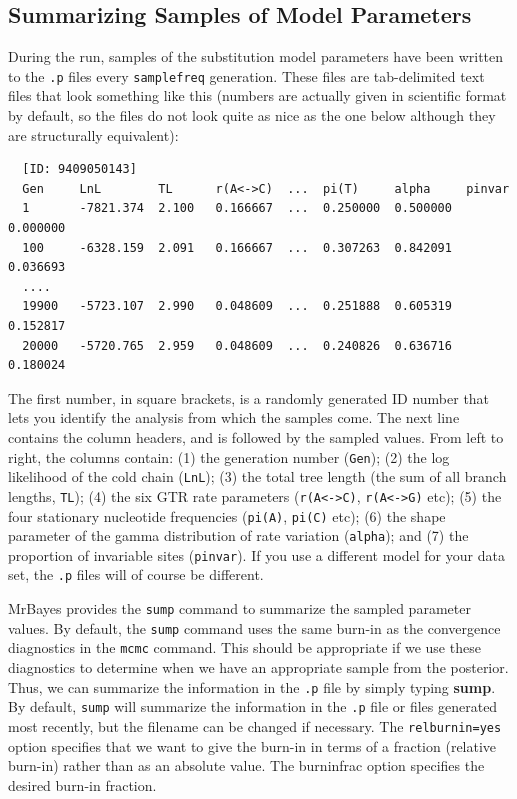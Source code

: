 \documentclass[12pt]{book}
\begin{document}
\subsection{Summarizing Samples of Model Parameters}

During the run, samples of the substitution model parameters have been written to the \texttt{.p} files 
every \texttt{samplefreq} generation. These files are tab-delimited text files that look something like this 
(numbers are actually given in scientific format by default, so the files do not look quite as nice as the 
one below although they are structurally equivalent):

\begin{singlespacing}
\small
\begin{verbatim}
  [ID: 9409050143]
  Gen     LnL        TL      r(A<->C)  ...  pi(T)     alpha     pinvar  
  1       -7821.374  2.100   0.166667  ...  0.250000  0.500000  0.000000
  100     -6328.159  2.091   0.166667  ...  0.307263  0.842091  0.036693
  ....
  19900   -5723.107  2.990   0.048609  ...  0.251888  0.605319  0.152817
  20000   -5720.765  2.959   0.048609  ...  0.240826  0.636716  0.180024
\end{verbatim}
\normalsize
\end{singlespacing}

The first number, in square brackets, is a randomly generated ID number that lets you identify the analysis 
from which the samples come. The next line contains the column headers, and is followed by the sampled 
values. From left to right, the columns contain: (1) the generation number (\texttt{Gen}); (2) the log 
likelihood of the cold chain (\texttt{LnL}); (3) the total tree length (the sum of all branch lengths, 
\texttt{TL}); (4) the six GTR rate parameters (\texttt{r(A<->C)}, \texttt{r(A<->G)} etc); (5) the four 
stationary nucleotide frequencies (\texttt{pi(A)}, \texttt{pi(C)} etc); (6) the shape parameter of the gamma 
distribution of rate variation (\texttt{alpha}); and (7) the proportion of invariable sites 
(\texttt{pinvar}). If you use a different model for your data set, the \texttt{.p} files will of course be 
different.

MrBayes provides the \texttt{sump} command to summarize the sampled parameter values. By default, the 
\texttt{sump} command uses the same burn-in as the convergence diagnostics in the \texttt{mcmc} command. 
This should be appropriate if we use these diagnostics to determine when we have an appropriate sample from 
the posterior. Thus, we can summarize the information in the \texttt{.p} file by simply typing 
\textbf{sump}. By default, \texttt{sump} will summarize the information in the \texttt{.p} file or files 
generated most recently, but the filename can be changed if necessary. The \texttt{relburnin=yes} option 
specifies that we want to give the burn-in in terms of a fraction (relative burn-in) rather than as an 
absolute value. The {burninfrac} option specifies the desired burn-in fraction.
\end{document}
